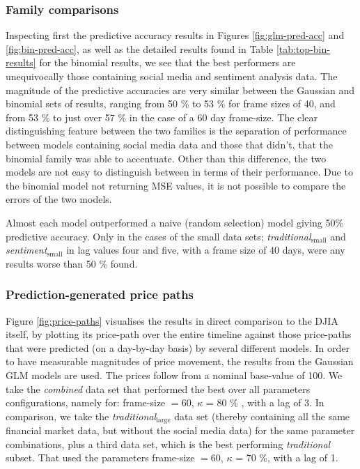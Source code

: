 \documentclass{article}
\begin{document}
\begin{table}
\end{table}

\pagebreak


\subsubsection{Family comparisons}
\label{sec-1-4-4}

Inspecting first the predictive accuracy results in Figures \ref{fig:glm-pred-acc} and \ref{fig:bin-pred-acc}, as well as the detailed results found in Table \ref{tab:top-bin-results} for the binomial results, we see that the best performers are unequivocally those containing social media and sentiment analysis data. The magnitude of the predictive accuracies are very similar between the Gaussian and binomial sets of results, ranging from 50 \% to 53 \% for frame sizes of 40, and from 53 \% to just over 57 \% in the case of a 60 day frame-size. The clear distinguishing feature between the two families is the separation of performance between models containing social media data and those that didn't, that the binomial family was able to accentuate. Other than this difference, the two models are not easy to distinguish between in terms of their performance. Due to the binomial model not returning MSE values, it is not possible to compare the errors of the two models.

Almost each model outperformed a naive (random selection) model giving 50\% predictive accuracy. Only in the cases of the small data sets; \emph{traditional$_{\text{small}}$} and \emph{sentiment$_{\text{small}}$} in lag values four and five, with a frame size of 40 days, were any results worse than 50 \% found.


\subsubsection{Prediction-generated price paths \label{price-paths}}
\label{sec-1-4-5}

Figure \ref{fig:price-paths} visualises the results in direct comparison to the DJIA itself, by plotting its price-path over the entire timeline against those price-paths that were predicted (on a day-by-day basis) by several different models. In order to have measurable magnitudes of price movement, the results from the Gaussian GLM models are used. The prices follow from a nominal base-value of 100. We take the \emph{combined} data set that performed the best over all parameters configurations, namely for: frame-size $= 60$, $\kappa$ = 80 \% , with a lag of 3. In comparison, we take the \emph{traditional$_{\text{large}}$} data set (thereby containing all the same financial market data, but without the social media data) for the same parameter combinations, plus a third data set, which is the best performing \emph{traditional} subset. That used the parameters frame-size $= 60$, $\kappa$ = 70 \%, with a lag of 1.
\end{document}
